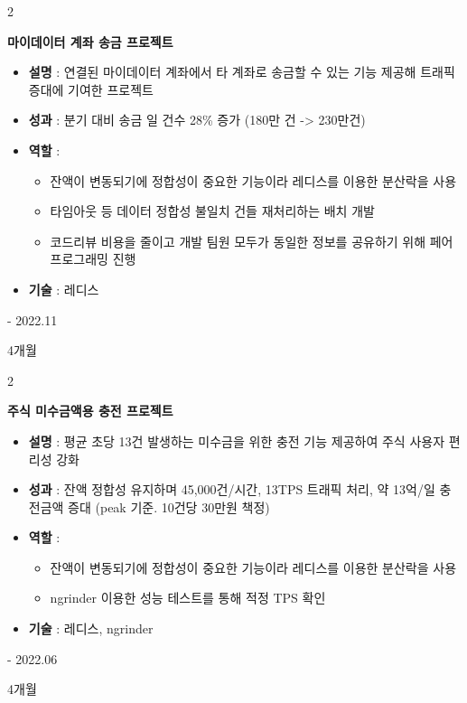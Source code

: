 \documentclass[10pt, letterpaper]{article}
\newenvironment{highlights}{
    \begin{itemize}[
        topsep=0.10 cm,
        parsep=0.10 cm,
        partopsep=0pt,
        itemsep=0pt,
        leftmargin=0.4 cm + 10pt
    ]
    }{
    \end{itemize}
} %
\newenvironment{twocolentry}[2][]{
    \onecolentry
    \def\secondColumn{#2}
    \setcolumnwidth{\fill, 4.5 cm}
    \begin{paracol}{2}
    }{
        \switchcolumn \raggedleft \secondColumn
    \end{paracol}
    \endonecolentry
} %
\begin{document}
   \vspace{0.2 cm}

    \begin{twocolentry}{
        2022.07 - 2022.11

        4개월
    }
        \textbf{마이데이터 계좌 송금 프로젝트}
        \begin{highlights}

            \item \textbf{설명} : 연결된 마이데이터 계좌에서 타 계좌로 송금할 수 있는 기능 제공해 트래픽 증대에 기여한 프로젝트
            \item \textbf{성과} : 분기 대비 송금 일 건수 28\% 증가 (180만 건 -> 230만건)
            \item \textbf{역할} :
            \begin{highlights}
                \item 잔액이 변동되기에 정합성이 중요한 기능이라 레디스를 이용한 분산락을 사용
                \item 타임아웃 등 데이터 정합성 불일치 건들 재처리하는 배치 개발
                \item 코드리뷰 비용을 줄이고 개발 팀원 모두가 동일한 정보를 공유하기 위해 페어프로그래밍 진행
            \end{highlights}
            \item \textbf{기술} : 레디스
        \end{highlights}
    \end{twocolentry}

    \vspace{0.2 cm}

    \begin{twocolentry}{
        2022.03 - 2022.06

        4개월
    }
        \textbf{주식 미수금액용 충전 프로젝트}
        \begin{highlights}

            \item \textbf{설명} : 평균 초당 13건 발생하는 미수금을 위한 충전 기능 제공하여 주식 사용자 편리성 강화
            \item \textbf{성과} : 잔액 정합성 유지하며 45,000건/시간, 13TPS 트래픽 처리, 약 13억/일 충전금액 증대 (peak 기준. 10건당 30만원 책정)
            \item \textbf{역할} :
            \begin{highlights}
                \item 잔액이 변동되기에 정합성이 중요한 기능이라 레디스를 이용한 분산락을 사용
                \item ngrinder 이용한 성능 테스트를 통해 적정 TPS 확인
            \end{highlights}
            \item \textbf{기술} : 레디스, ngrinder
        \end{highlights}
    \end{twocolentry}
\end{document}
